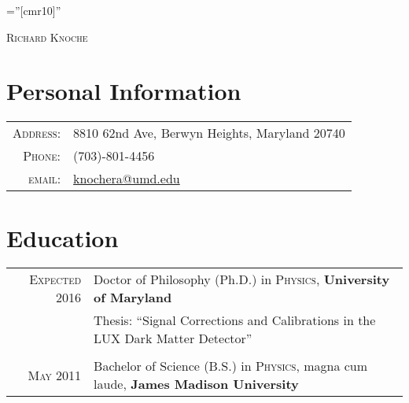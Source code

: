 \documentclass[a4paper,10pt]{article}
\begin{document}

\pagestyle{empty} %

\font\fb=''[cmr10]'' %

\par{\centering
		{\Huge \textsc{Richard Knoche}
	}\bigskip\par}

\section{Personal Information}

\begin{tabular}{rl}
    \textsc{Address:}   & 8810 62nd Ave, Berwyn Heights, Maryland 20740 \\
    \textsc{Phone:}     & (703)-801-4456\\
    \textsc{email:}     & \href{mailto:knochera@umd.edu}{knochera@umd.edu}
\end{tabular}

\section{Education}
\begin{tabular}{rl}	
 \textsc{Expected} 2016 & Doctor of Philosophy (Ph.D.) in \textsc{Physics}, \textbf{University of Maryland}\\
& Thesis: ``Signal Corrections and Calibrations in the LUX Dark Matter Detector'' \\&\\
\textsc{May} 2011& Bachelor of Science (B.S.) in \textsc{Physics}, magna cum laude,  \textbf{James Madison University} 
\end{tabular}

\end{document}
